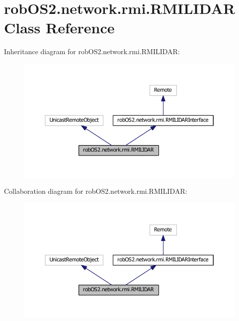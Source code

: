 \hypertarget{classrob_o_s2_1_1network_1_1rmi_1_1_r_m_i_l_i_d_a_r}{
\section{robOS2.network.rmi.RMILIDAR Class Reference}
\label{classrob_o_s2_1_1network_1_1rmi_1_1_r_m_i_l_i_d_a_r}
}


Inheritance diagram for robOS2.network.rmi.RMILIDAR:
\nopagebreak
\begin{figure}[H]
\begin{center}
\leavevmode
\includegraphics[width=393pt]{classrob_o_s2_1_1network_1_1rmi_1_1_r_m_i_l_i_d_a_r__inherit__graph}
\end{center}
\end{figure}


Collaboration diagram for robOS2.network.rmi.RMILIDAR:
\nopagebreak
\begin{figure}[H]
\begin{center}
\leavevmode
\includegraphics[width=393pt]{classrob_o_s2_1_1network_1_1rmi_1_1_r_m_i_l_i_d_a_r__coll__graph}
\end{center}
\end{figure}
